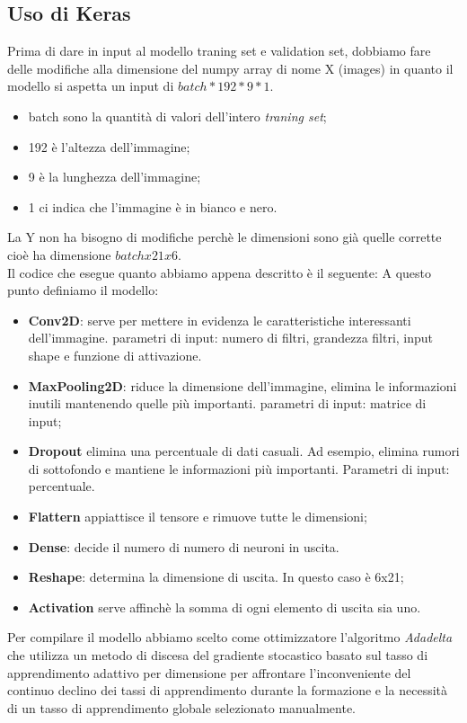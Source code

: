 \subsection{Uso di Keras}
Prima di dare in input al modello traning set e validation set, dobbiamo fare delle modifiche alla dimensione del numpy array di nome X (images) in quanto il modello si aspetta un input di $batch*192*9*1$.
\begin{itemize}
	\item batch sono la quantità di valori dell'intero \textit{traning set};
	\item 192 è l'altezza dell'immagine;
	\item 9 è la lunghezza dell'immagine;
	\item 1 ci indica che l'immagine è in bianco e nero.
\end{itemize}
La Y non ha bisogno di modifiche perchè le dimensioni sono già quelle corrette cioè ha dimensione $batchx21x6$.\\
Il codice che esegue quanto abbiamo appena descritto è il seguente:
\vspace*{2ex}
\vspace*{2ex}
A questo punto definiamo il modello:
\begin{itemize}
	\item \textbf{Conv2D}: serve per mettere in evidenza le caratteristiche interessanti dell'immagine. parametri di input: numero di filtri, grandezza filtri, input shape e funzione di attivazione.
	\item \textbf{MaxPooling2D}: riduce la dimensione dell'immagine, elimina le informazioni inutili mantenendo quelle più importanti. parametri di input: matrice di input;
	\item \textbf{Dropout} elimina una percentuale di dati casuali. Ad esempio, elimina rumori di sottofondo e mantiene le informazioni più importanti. Parametri di input: percentuale.
	\item \textbf{Flattern} appiattisce il tensore e rimuove tutte le dimensioni;
	\item \textbf{Dense}: decide il numero di numero di neuroni in uscita.
	\item \textbf{Reshape}: determina la dimensione di uscita. In questo caso è 6x21;
	\item \textbf{Activation} serve affinchè la somma di ogni elemento di uscita sia uno.
\end{itemize}
Per compilare il modello abbiamo scelto come ottimizzatore l'algoritmo \textit{Adadelta} che utilizza un metodo di discesa del gradiente stocastico basato sul tasso di apprendimento adattivo per dimensione per affrontare l'inconveniente del continuo declino dei tassi di apprendimento durante la formazione e la necessità di un tasso di apprendimento globale selezionato manualmente.
